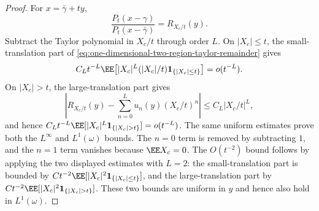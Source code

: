 \begin{proof}
For \(x=\bar{\gamma}+ty\),
\[
\frac{P_t(x-\gamma)}{P_t(x-\bar{\gamma})}
=R_{X_c/t}(y).
\]
Subtract the Taylor polynomial in \(X_c/t\) through order \(L\).  On
\(|X_c|\le t\), the small-translation part of
\eqref{eq:one-dimensional-two-region-taylor-remainder} gives
\[
C_Lt^{-L}\EE\!\left[|X_c|^L(|X_c|/t)\mathbf1_{\{|X_c|\le t\}}\right]
=o(t^{-L}).
\]
On \(|X_c|>t\), the large-translation part gives
\[
\left|R_{X_c/t}(y)-\sum_{n=0}^{L}u_n(y)(X_c/t)^n\right|
\le C_L|X_c/t|^L,
\]
and hence \(C_Lt^{-L}\EE[|X_c|^L\mathbf1_{\{|X_c|>t\}}]=o(t^{-L})\).  The same
uniform estimates prove both the \(L^\infty\) and \(L^1(\omega)\) bounds.  The
\(n=0\) term is removed by subtracting \(1\), and the \(n=1\) term vanishes
because \(\EE X_c=0\).  The \(O(t^{-2})\) bound follows by applying the two
displayed estimates with \(L=2\): the small-translation part is bounded by
\(Ct^{-2}\EE[|X_c|^2\mathbf1_{\{|X_c|\le t\}}]\), and the
large-translation part by
\(Ct^{-2}\EE[|X_c|^2\mathbf1_{\{|X_c|>t\}}]\).  These two bounds are
uniform in \(y\) and hence also hold in \(L^1(\omega)\).
\end{proof}

